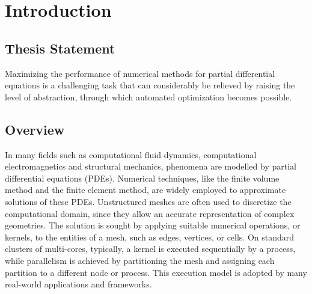 \chapter{Introduction}

\section{Thesis Statement}




Maximizing the performance of numerical methods for partial differential equations is a challenging task that can considerably be relieved by raising the level of abstraction, through which automated optimization becomes possible. 

\section{Overview}
In many fields such as computational fluid dynamics, computational electromagnetics and structural mechanics, phenomena are modelled by partial differential equations (PDEs). Numerical techniques, like the finite volume method and the finite element method, are widely employed to approximate solutions of these PDEs. Unstructured meshes are often used to discretize the computational domain, since they allow an accurate representation of complex geometries. The solution is sought by applying suitable numerical operations, or kernels, to the entities of a mesh, such as edges, vertices, or cells. On standard clusters of multi-cores, typically, a kernel is executed sequentially by a process, while parallelism is achieved by partitioning the mesh and assigning each partition to a different node or process. This execution model is adopted by many real-world applications and frameworks.

